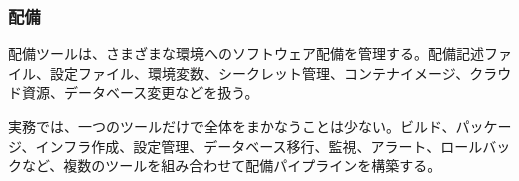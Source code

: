 \subsubsection{配備}

配備ツールは、さまざまな環境へのソフトウェア配備を管理する。配備記述ファイル、設定ファイル、環境変数、シークレット管理、コンテナイメージ、クラウド資源、データベース変更などを扱う。

実務では、一つのツールだけで全体をまかなうことは少ない。ビルド、パッケージ、インフラ作成、設定管理、データベース移行、監視、アラート、ロールバックなど、複数のツールを組み合わせて配備パイプラインを構築する。
